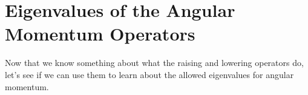 %
%
%
%

\section*{Eigenvalues of the Angular Momentum Operators}

	Now that we know something about what the raising and lowering operators do, let's see if we can use them to learn about the allowed eigenvalues for angular momentum.
	
